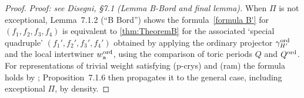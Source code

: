\begin{proof}
  \textit{Proof: see Disegni, §7.1 (Lemma B-Bord and final lemma).}
  When $\Pi$ is not exceptional, Lemma~7.1.2 (``B Bord'') shows the
  formula~\eqref{formula B'} for $(f_1,f_2,f_3,f_4)$ is equivalent to
  \cref{thm:TheoremB} for the associated `special quadruple'
  $(f_1', f_2', f_3', f_4')$ obtained by applying the ordinary
  projector $\gamma^{\mathrm{ord}}_{H'}$ and the local intertwiner $w^{\mathrm{ord}}_{\rm a}$,
  using the comparison of toric periods $Q$ and $Q^{\mathrm{ord}}$.  For
  representations of trivial weight satisfying (p-crys) and (ram) the
  formula holds by \cite[Theorem~B]{nonsplit}; Proposition~7.1.6 then
  propagates it to the general case, including exceptional $\Pi$, by
  density.
\end{proof}

